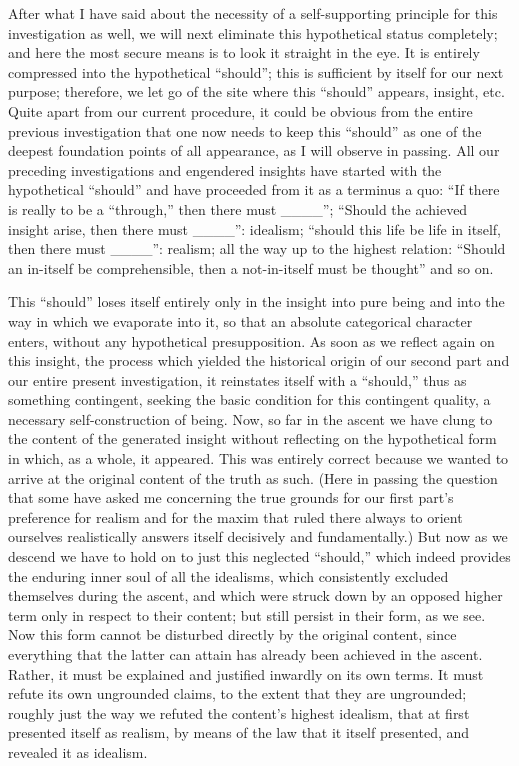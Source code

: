 After what I have said about the necessity
of a self-supporting principle for this investigation as well,
we will next eliminate this hypothetical status completely;
and here the most secure means is to look it straight in the eye.
It is entirely compressed into the hypothetical “should”;
this is sufficient by itself for our next purpose;
therefore, we let go of the site
where this “should” appears, insight, etc.
Quite apart from our current procedure,
it could be obvious from the entire previous investigation
that one now needs to keep this “should”
as one of the deepest foundation points of all appearance,
as I will observe in passing.
All our preceding investigations and engendered
insights have started with the hypothetical “should”
and have proceeded from it as a terminus a quo:
“If there is really to be a “through,” then there must ____”;
“Should the achieved insight arise, then there must ____”: idealism;
“should this life be life in itself, then there must ____”: realism;
all the way up to the highest relation:
“Should an in-itself be comprehensible,
then a not-in-itself must be thought” and so on.

This “should” loses itself entirely
only in the insight into pure being
and into the way in which we evaporate into it,
so that an absolute categorical character enters,
without any hypothetical presupposition.
As soon as we reflect again on this insight,
the process which yielded the historical origin
of our second part and our entire present investigation,
it reinstates itself with a “should,”
thus as something contingent,
seeking the basic condition for this contingent quality,
a necessary self-construction of being.
Now, so far in the ascent we have clung to
the content of the generated insight without reflecting
on the hypothetical form in which, as a whole, it appeared.
This was entirely correct because we wanted to arrive
at the original content of the truth as such.
(Here in passing the question that some have asked me concerning
the true grounds for our first part's preference for realism and
for the maxim that ruled there always to orient ourselves realistically
answers itself decisively and fundamentally.)
But now as we descend we have to hold on
to just this neglected “should,”
which indeed provides the enduring
inner soul of all the idealisms,
which consistently excluded themselves during the ascent,
and which were struck down by an opposed higher term
only in respect to their content;
but still persist in their form, as we see.
Now this form cannot be disturbed
directly by the original content,
since everything that the latter can attain
has already been achieved in the ascent.
Rather, it must be explained
and justified inwardly on its own terms.
It must refute its own ungrounded claims,
to the extent that they are ungrounded;
roughly just the way we refuted
the content's highest idealism,
that at first presented itself as realism,
by means of the law that it itself presented,
and revealed it as idealism.

